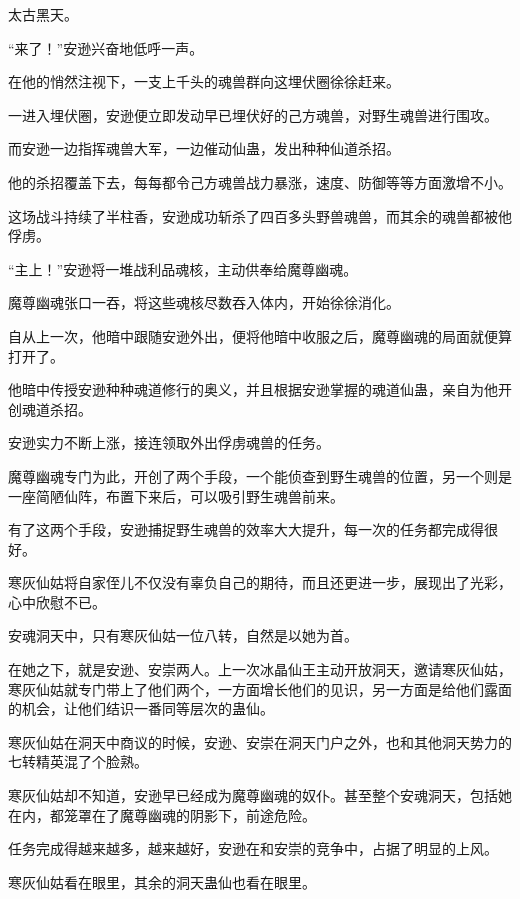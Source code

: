 
\begin{this_body}

太古黑天。

“来了！”安逊兴奋地低呼一声。

在他的悄然注视下，一支上千头的魂兽群向这埋伏圈徐徐赶来。

一进入埋伏圈，安逊便立即发动早已埋伏好的己方魂兽，对野生魂兽进行围攻。

而安逊一边指挥魂兽大军，一边催动仙蛊，发出种种仙道杀招。

他的杀招覆盖下去，每每都令己方魂兽战力暴涨，速度、防御等等方面激增不小。

这场战斗持续了半柱香，安逊成功斩杀了四百多头野兽魂兽，而其余的魂兽都被他俘虏。

“主上！”安逊将一堆战利品魂核，主动供奉给魔尊幽魂。

魔尊幽魂张口一吞，将这些魂核尽数吞入体内，开始徐徐消化。

自从上一次，他暗中跟随安逊外出，便将他暗中收服之后，魔尊幽魂的局面就便算打开了。

他暗中传授安逊种种魂道修行的奥义，并且根据安逊掌握的魂道仙蛊，亲自为他开创魂道杀招。

安逊实力不断上涨，接连领取外出俘虏魂兽的任务。

魔尊幽魂专门为此，开创了两个手段，一个能侦查到野生魂兽的位置，另一个则是一座简陋仙阵，布置下来后，可以吸引野生魂兽前来。

有了这两个手段，安逊捕捉野生魂兽的效率大大提升，每一次的任务都完成得很好。

寒灰仙姑将自家侄儿不仅没有辜负自己的期待，而且还更进一步，展现出了光彩，心中欣慰不已。

安魂洞天中，只有寒灰仙姑一位八转，自然是以她为首。

在她之下，就是安逊、安崇两人。上一次冰晶仙王主动开放洞天，邀请寒灰仙姑，寒灰仙姑就专门带上了他们两个，一方面增长他们的见识，另一方面是给他们露面的机会，让他们结识一番同等层次的蛊仙。

寒灰仙姑在洞天中商议的时候，安逊、安崇在洞天门户之外，也和其他洞天势力的七转精英混了个脸熟。

寒灰仙姑却不知道，安逊早已经成为魔尊幽魂的奴仆。甚至整个安魂洞天，包括她在内，都笼罩在了魔尊幽魂的阴影下，前途危险。

任务完成得越来越多，越来越好，安逊在和安崇的竞争中，占据了明显的上风。

寒灰仙姑看在眼里，其余的洞天蛊仙也看在眼里。


\end{this_body}
